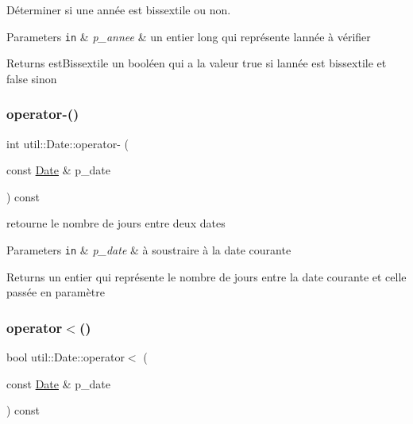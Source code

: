 Déterminer si une année est bissextile ou non. 


\begin{DoxyParams}[1]{Parameters}
\mbox{\tt in}  & {\em p\+\_\+annee} & un entier long qui représente l\textquotesingle{}année à vérifier \\
\hline
\end{DoxyParams}
\begin{DoxyReturn}{Returns}
est\+Bissextile un booléen qui a la valeur true si l\textquotesingle{}année est bissextile et false sinon 
\end{DoxyReturn}
\mbox{\label{classutil_1_1Date_af12f2c545070b5e2b397be5379c5c3fd}} 
\subsubsection{\texorpdfstring{operator-\/()}{operator-()}}
{\footnotesize\ttfamily int util\+::\+Date\+::operator-\/ (\begin{DoxyParamCaption}\item[{const \hyperlink{classutil_1_1Date}{Date} \&}]{p\+\_\+date }\end{DoxyParamCaption}) const}



retourne le nombre de jours entre deux dates 


\begin{DoxyParams}[1]{Parameters}
\mbox{\tt in}  & {\em p\+\_\+date} & à soustraire à la date courante \\
\hline
\end{DoxyParams}
\begin{DoxyReturn}{Returns}
un entier qui représente le nombre de jours entre la date courante et celle passée en paramètre 
\end{DoxyReturn}
\mbox{\label{classutil_1_1Date_aefcf8a7520711f783fb0241d460480c5}} 
\subsubsection{\texorpdfstring{operator$<$()}{operator<()}}
{\footnotesize\ttfamily bool util\+::\+Date\+::operator$<$ (\begin{DoxyParamCaption}\item[{const \hyperlink{classutil_1_1Date}{Date} \&}]{p\+\_\+date }\end{DoxyParamCaption}) const}



